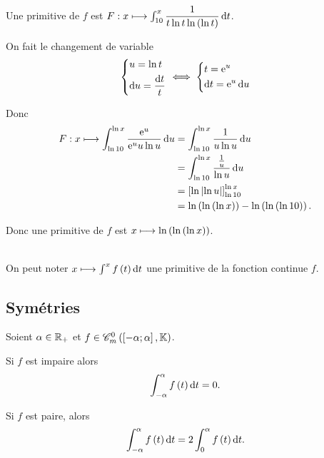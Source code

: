 \begin{corr}[3]
Une primitive de \(f\) est \(F:x\mapsto\int_{10}^x\dfrac{1}{t\ln t\ln\paren{\ln t}}\odif{t}\).

On fait le changement de variable \[\begin{dcases}u=\ln t \\ \odif{u}=\dfrac{\odif{t}}{t}\end{dcases}\ssi\begin{dcases}t=\e{u} \\ \odif{t}=\e{u}\odif{u}\end{dcases}\]

Donc \[\begin{aligned}
F:x\mapsto\int_{\ln10}^{\ln x}\dfrac{\e{u}}{\e{u}u\ln u}\odif{u}&=\int_{\ln10}^{\ln x}\dfrac{1}{u\ln u}\odif{u} \\
&=\int_{\ln10}^{\ln x}\dfrac{\frac{1}{u}}{\ln u}\odif{u} \\
&=\croch{\ln\abs{\ln u}}_{\ln10}^{\ln x} \\
&=\ln\paren{\ln\paren{\ln x}}-\ln\paren{\ln\paren{\ln10}}.
\end{aligned}\]

Donc une primitive de \(f\) est \(x\longmapsto\ln\left(\ln\left(\ln x\right)\right)\).
\end{corr}

\begin{nota}[Officielle]~\\
On peut noter \(x\mapsto\int^xf\paren{t}\odif{t}\) une primitive de la fonction continue \(f\).
\end{nota}

\subsection{Symétries}

\begin{prop}
Soient \(\alpha\in\mathbb{R}_+\) et \(f\in\contm[\intervii{-\alpha}{\alpha}]\).

Si \(f\) est impaire alors \[\int_{-\alpha}^{\alpha}f\paren{t}\odif{t}=0.\]

Si \(f\) est paire, alors \[\int_{-\alpha}^{\alpha}f\paren{t}\odif{t}=2\int_0^{\alpha}f\paren{t}\odif{t}.\]
\end{prop}

